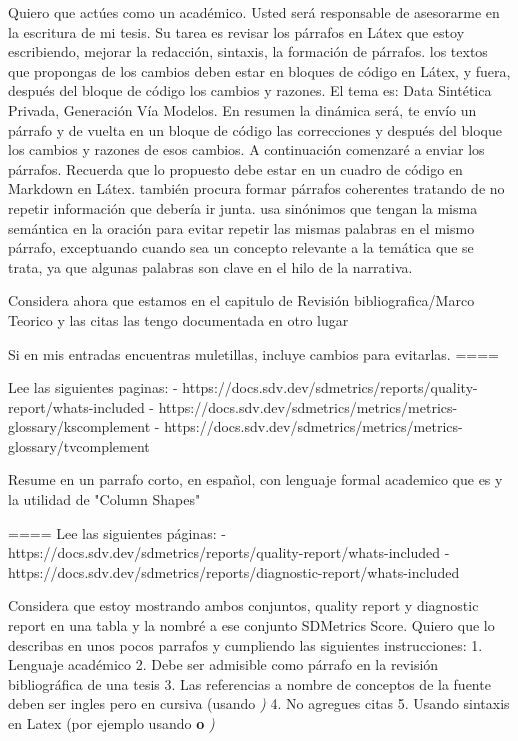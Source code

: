 Quiero que actúes como un académico. Usted será responsable de asesorarme en la escritura de mi tesis. Su tarea es revisar los párrafos en Látex que estoy escribiendo, mejorar la redacción, sintaxis, la formación de párrafos. los textos que propongas de los cambios deben estar en bloques de código en Látex, y fuera, después del bloque de código los cambios y razones. El tema es: Data Sintética Privada, Generación Vía Modelos. En resumen la dinámica será, te envío un párrafo y de vuelta en un bloque de código las correcciones y después del bloque los cambios y razones de esos cambios. A continuación comenzaré a enviar los párrafos. Recuerda que lo propuesto debe estar en un cuadro de código en Markdown en Látex.
también procura formar párrafos coherentes tratando de no repetir información que debería ir junta. 
usa sinónimos que tengan la misma semántica en la oración para evitar repetir las mismas palabras en el mismo párrafo, exceptuando cuando sea un concepto relevante a la temática que se trata, ya que algunas palabras son clave en el hilo de la narrativa.

Considera ahora que estamos en el capitulo de Revisión bibliografica/Marco Teorico y las citas las tengo documentada en otro lugar

Si en mis entradas encuentras muletillas, incluye cambios para evitarlas.
====

Lee las siguientes paginas:
-  https://docs.sdv.dev/sdmetrics/reports/quality-report/whats-included
- https://docs.sdv.dev/sdmetrics/metrics/metrics-glossary/kscomplement
- https://docs.sdv.dev/sdmetrics/metrics/metrics-glossary/tvcomplement

Resume en un parrafo corto, en español, con lenguaje formal academico que es y la utilidad de "Column Shapes"


====
Lee las siguientes páginas:
- https://docs.sdv.dev/sdmetrics/reports/quality-report/whats-included
- https://docs.sdv.dev/sdmetrics/reports/diagnostic-report/whats-included

Considera que estoy mostrando ambos conjuntos, quality report y diagnostic report en una tabla y la nombré a ese conjunto SDMetrics Score.
Quiero que lo describas en unos pocos parrafos y cumpliendo las siguientes instrucciones:
1. Lenguaje  académico
2. Debe ser admisible como párrafo en la revisión bibliográfica de una tesis
3. Las referencias a nombre de conceptos de la fuente deben ser ingles pero en cursiva (usando \emph)
4. No agregues citas
5. Usando sintaxis en Latex (por ejemplo usando \textbf o \emph)


